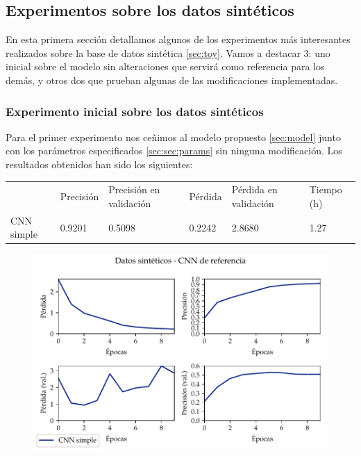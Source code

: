 \documentclass[a4paper, 20pt, dvipsnames]{article}
\begin{document}
\subsection{Experimentos sobre los datos sintéticos}

En esta primera sección detallamos algunos de los experimentos más interesantes
realizados sobre la base de datos sintética \ref{sec:toy}. Vamos a destacar 3:
uno inicial sobre el modelo sin alteraciones que servirá como referencia para
los demás, y otros dos que prueban algunas de las modificaciones implementadas.

\subsubsection{Experimento inicial sobre los datos sintéticos}
\label{exp:toy1}

Para el primer experimento nos ceñimos al modelo propuesto \ref{sec:model} junto
con los parámetros especificados \ref{sec:sec:params} sin ninguna
modificación. Los resultados obtenidos han sido los siguientes:

\begin{table}[H]
	\centering
	\begin{tabular}{llllll}
		& Precisión & Precisión en validación & Pérdida & Pérdida en validación & Tiempo (h) \\ \cline{2-6} 
		CNN simple & 0.9201    & 0.5098                  & 0.2242  & 2.8680                & 1.27      
	\end{tabular}
\end{table}

\begin{figure}[H]
	\centering
	\includegraphics{fig/toy-1.pdf}
\end{figure}
\end{document}
